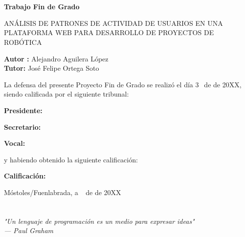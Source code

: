 \documentclass[a4paper, 12pt]{book}
\begin{document}
\newpage
\mbox{}
\thispagestyle{empty} %


\clearpage
{}
\chapter*{}

\vspace{-4cm}
\begin{center}
\LARGE
\textbf{Trabajo Fin de Grado}

\vspace{1cm}
\large
ANÁLISIS DE PATRONES DE ACTIVIDAD DE USUARIOS EN UNA PLATAFORMA WEB 
PARA DESARROLLO DE PROYECTOS DE ROBÓTICA

\vspace{1cm}
\large
\textbf{Autor :} Alejandro Aguilera López  \\
\textbf{Tutor:} José Felipe Ortega Soto

\end{center}

\vspace{1cm}
La defensa del presente Proyecto Fin de Grado se realizó el día 3\qquad$\;\,$ de
\qquad\qquad\qquad\qquad \newline de 20XX, siendo calificada por el siguiente tribunal:


\vspace{0.5cm}
\textbf{Presidente:}

\vspace{0.8cm}
\textbf{Secretario:}

\vspace{0.8cm}
\textbf{Vocal:}


\vspace{0.8cm}
y habiendo obtenido la siguiente calificación:

\vspace{0.8cm}
\textbf{Calificación:}


\vspace{0.8cm}
\begin{flushright}
Móstoles/Fuenlabrada, a \qquad$\;\,$ de \qquad\qquad\qquad\qquad de 20XX
\end{flushright}


\chapter*{}
\begin{flushright}
\textit{"Un lenguaje de programación es un medio para expresar ideas" \\
--- Paul Graham\\}
\end{flushright}
\end{document}
